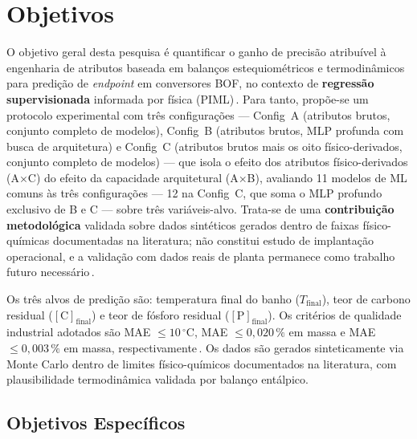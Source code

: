 \section{Objetivos}
\label{sec:objetivo}

O objetivo geral desta pesquisa é quantificar o ganho de precisão atribuível à engenharia de atributos baseada em balanços estequiométricos e termodinâmicos para predição de \textit{endpoint} em conversores BOF, no contexto de \textbf{regressão supervisionada} informada por física (PIML)\,\cite{willard2020integrating,cuomo2022physics}. Para tanto, propõe-se um protocolo experimental com três configurações — Config~A (atributos brutos, conjunto completo de modelos), Config~B (atributos brutos, MLP profunda com busca de arquitetura) e Config~C (atributos brutos mais os oito físico-derivados, conjunto completo de modelos) — que isola o efeito dos atributos físico-derivados (A$\times$C) do efeito da capacidade arquitetural (A$\times$B), avaliando 11 modelos de ML comuns às três configurações --- 12 na Config~C, que soma o MLP profundo exclusivo de B e C --- sobre três variáveis-alvo. Trata-se de uma \textbf{contribuição metodológica} validada sobre dados sintéticos gerados dentro de faixas físico-químicas documentadas na literatura; não constitui estudo de implantação operacional, e a validação com dados reais de planta permanece como trabalho futuro necessário\,\cite{buggineni2024synthetic}.

Os três alvos de predição são: temperatura final do banho ($T_\text{final}$), teor de carbono residual ($[\text{C}]_\text{final}$) e teor de fósforo residual ($[\text{P}]_\text{final}$). Os critérios de qualidade industrial adotados são MAE $\leq 10\,^\circ\text{C}$, MAE $\leq 0{,}020\,\%$ em massa e MAE $\leq 0{,}003\,\%$ em massa, respectivamente\,\cite{zhou2024bof,bae2020bof}. Os dados são gerados sinteticamente via Monte Carlo dentro de limites físico-químicos documentados na literatura, com plausibilidade termodinâmica validada por balanço entálpico.

\subsection{Objetivos Específicos}
\label{subsec:objetivos-especificos}

